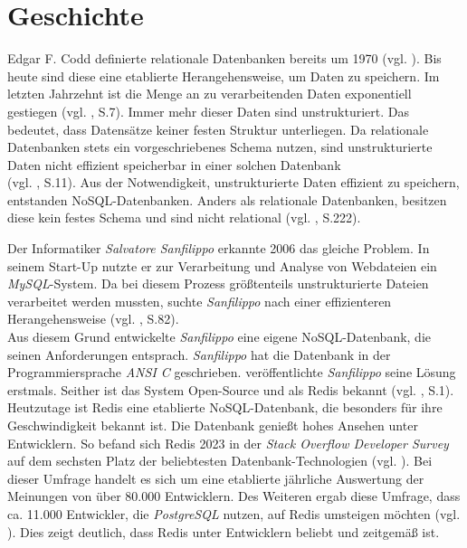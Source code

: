 
\section{Geschichte}
\label{Geschichte}
Edgar F. Codd definierte relationale Datenbanken bereits um 1970 (vgl. \cite{codd}). Bis heute sind diese eine etablierte Herangehensweise, um Daten zu speichern. Im letzten Jahrzehnt ist die Menge an zu verarbeitenden Daten exponentiell gestiegen (vgl. \cite{nosql}, S.7). Immer mehr dieser Daten sind unstrukturiert. Das bedeutet, dass Datensätze keiner festen Struktur unterliegen. Da relationale Datenbanken stets ein vorgeschriebenes Schema nutzen, sind unstrukturierte Daten nicht effizient speicherbar in einer solchen Datenbank 
\\(vgl. \cite{1}, S.11). Aus der Notwendigkeit, unstrukturierte Daten effizient zu speichern, entstanden \ac{NoSQL}-Datenbanken. Anders als relationale Datenbanken, besitzen diese kein festes Schema und sind nicht relational (vgl. \cite{1}, S.222).

Der Informatiker \textit{Salvatore Sanfilippo} erkannte 2006 das gleiche Problem. In seinem Start-Up nutzte er zur Verarbeitung und Analyse von Webdateien ein\textit{ MySQL}-System. Da bei diesem Prozess größtenteils unstrukturierte Dateien verarbeitet werden mussten, suchte \textit{Sanfilippo} nach einer effizienteren Herangehensweise (vgl. \cite{nosql}, S.82).
\\Aus diesem Grund entwickelte \textit{Sanfilippo} eine eigene \acs{NoSQL}-Datenbank, die seinen Anforderungen entsprach. \textit{Sanfilippo} hat die Datenbank in der Programmiersprache \textit{ANSI C} geschrieben.
 veröffentlichte \textit{Sanfilippo} seine Lösung erstmals. Seither ist das System Open-Source und als \acs{Redis} bekannt (vgl. \cite{learningRedis}, S.1). Heutzutage ist \acs{Redis} eine etablierte \acs{NoSQL}-Datenbank, die besonders für ihre Geschwindigkeit bekannt ist. Die Datenbank genießt hohes Ansehen unter Entwicklern. So befand sich \acs{Redis} 2023 in der \textit{Stack Overflow \newline Developer Survey} auf dem sechsten Platz der beliebtesten Datenbank-Technologien (vgl. \cite{stackOver}). Bei dieser Umfrage handelt es sich um eine etablierte jährliche Auswertung der Meinungen von über 80.000 Entwicklern. Des Weiteren ergab diese Umfrage, dass ca. 11.000 Entwickler, die \textit{PostgreSQL} nutzen, auf \acs{Redis} umsteigen möchten (vgl. \cite{stackOver}). Dies zeigt deutlich, dass \acs{Redis} unter Entwicklern beliebt und zeitgemäß ist. 